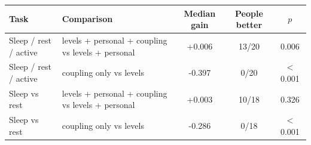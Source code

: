 \begin{tabular}{llccc}
\toprule
Task & Comparison & Median gain & People better & $p$ \\
\midrule
Sleep / rest / active & levels + personal + coupling vs levels + personal & +0.006 & 13/20 & 0.006 \\
Sleep / rest / active & coupling only vs levels & -0.397 & 0/20 & $<$0.001 \\
Sleep vs rest & levels + personal + coupling vs levels + personal & +0.003 & 10/18 & 0.326 \\
Sleep vs rest & coupling only vs levels & -0.286 & 0/18 & $<$0.001 \\
\bottomrule
\end{tabular}
